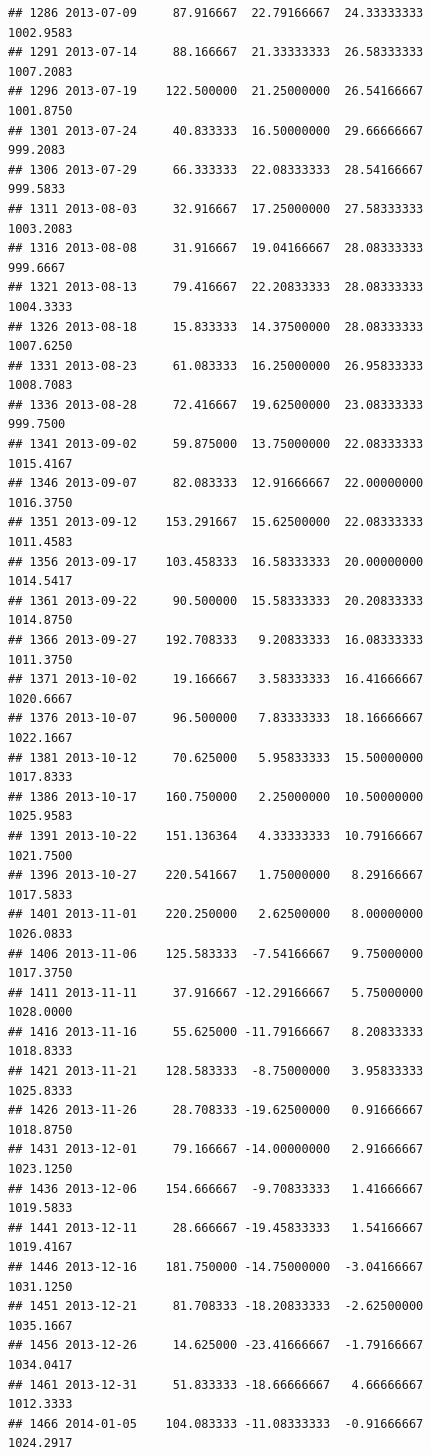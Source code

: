 \documentclass[
]{article}
\begin{document}
\begin{verbatim}
## 1286 2013-07-09     87.916667  22.79166667  24.33333333    1002.9583
## 1291 2013-07-14     88.166667  21.33333333  26.58333333    1007.2083
## 1296 2013-07-19    122.500000  21.25000000  26.54166667    1001.8750
## 1301 2013-07-24     40.833333  16.50000000  29.66666667     999.2083
## 1306 2013-07-29     66.333333  22.08333333  28.54166667     999.5833
## 1311 2013-08-03     32.916667  17.25000000  27.58333333    1003.2083
## 1316 2013-08-08     31.916667  19.04166667  28.08333333     999.6667
## 1321 2013-08-13     79.416667  22.20833333  28.08333333    1004.3333
## 1326 2013-08-18     15.833333  14.37500000  28.08333333    1007.6250
## 1331 2013-08-23     61.083333  16.25000000  26.95833333    1008.7083
## 1336 2013-08-28     72.416667  19.62500000  23.08333333     999.7500
## 1341 2013-09-02     59.875000  13.75000000  22.08333333    1015.4167
## 1346 2013-09-07     82.083333  12.91666667  22.00000000    1016.3750
## 1351 2013-09-12    153.291667  15.62500000  22.08333333    1011.4583
## 1356 2013-09-17    103.458333  16.58333333  20.00000000    1014.5417
## 1361 2013-09-22     90.500000  15.58333333  20.20833333    1014.8750
## 1366 2013-09-27    192.708333   9.20833333  16.08333333    1011.3750
## 1371 2013-10-02     19.166667   3.58333333  16.41666667    1020.6667
## 1376 2013-10-07     96.500000   7.83333333  18.16666667    1022.1667
## 1381 2013-10-12     70.625000   5.95833333  15.50000000    1017.8333
## 1386 2013-10-17    160.750000   2.25000000  10.50000000    1025.9583
## 1391 2013-10-22    151.136364   4.33333333  10.79166667    1021.7500
## 1396 2013-10-27    220.541667   1.75000000   8.29166667    1017.5833
## 1401 2013-11-01    220.250000   2.62500000   8.00000000    1026.0833
## 1406 2013-11-06    125.583333  -7.54166667   9.75000000    1017.3750
## 1411 2013-11-11     37.916667 -12.29166667   5.75000000    1028.0000
## 1416 2013-11-16     55.625000 -11.79166667   8.20833333    1018.8333
## 1421 2013-11-21    128.583333  -8.75000000   3.95833333    1025.8333
## 1426 2013-11-26     28.708333 -19.62500000   0.91666667    1018.8750
## 1431 2013-12-01     79.166667 -14.00000000   2.91666667    1023.1250
## 1436 2013-12-06    154.666667  -9.70833333   1.41666667    1019.5833
## 1441 2013-12-11     28.666667 -19.45833333   1.54166667    1019.4167
## 1446 2013-12-16    181.750000 -14.75000000  -3.04166667    1031.1250
## 1451 2013-12-21     81.708333 -18.20833333  -2.62500000    1035.1667
## 1456 2013-12-26     14.625000 -23.41666667  -1.79166667    1034.0417
## 1461 2013-12-31     51.833333 -18.66666667   4.66666667    1012.3333
## 1466 2014-01-05    104.083333 -11.08333333  -0.91666667    1024.2917

\end{verbatim}
\end{document}
